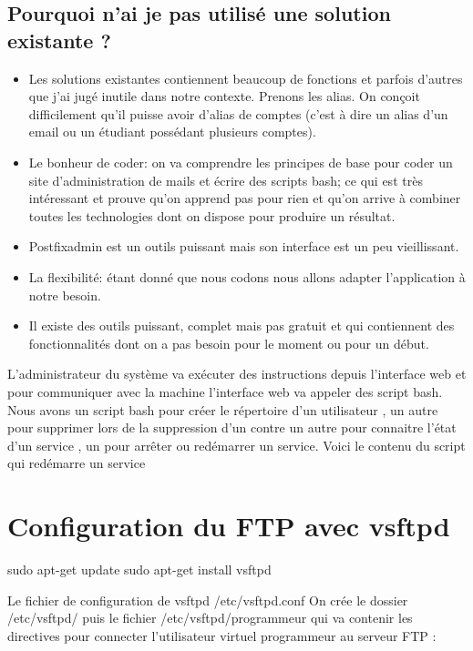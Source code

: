 \documentclass[a4paper,12pt,french]{report} %
\begin{document}
\subsection*{Pourquoi n'ai je pas utilisé une solution existante ?}
\begin{itemize}
\item Les solutions existantes contiennent beaucoup de fonctions et parfois d'autres que j'ai jugé inutile dans notre contexte. Prenons les alias. On conçoit difficilement qu'il puisse avoir d'alias de comptes (c'est à dire un alias d'un email ou un étudiant possédant plusieurs comptes).
\item Le bonheur de coder: on va comprendre les principes de base pour coder un site d'administration de mails et écrire des scripts bash; ce qui est très intéressant et prouve qu'on apprend pas pour rien et qu'on arrive à combiner toutes les technologies dont on dispose pour produire un résultat.
\item Postfixadmin est un outils puissant mais son interface est un peu vieillissant.
\item  La flexibilité: étant donné que nous codons nous allons adapter l'application à notre besoin.
\item Il existe des outils puissant, complet mais pas gratuit et qui contiennent des fonctionnalités dont on a pas besoin pour le moment ou pour un début.
\end{itemize}
L'administrateur du système va  exécuter des instructions depuis l'interface web et pour communiquer avec la machine l'interface web va appeler des script bash. Nous avons un script bash pour créer le répertoire d'un utilisateur , un autre pour supprimer lors de la suppression d'un contre un autre pour connaitre l'état d'un service , un pour arrêter ou redémarrer un service. Voici le contenu du script qui redémarre un service 
\section{Configuration du FTP  avec vsftpd}
\begin{exempleConsole}
sudo apt-get update
sudo apt-get install vsftpd
\end{exempleConsole}
Le fichier de configuration de vsftpd /etc/vsftpd.conf
On crée le dossier /etc/vsftpd/ puis le fichier /etc/vsftpd/programmeur qui va contenir les directives pour connecter l'utilisateur virtuel programmeur au serveur FTP :
\end{document}
